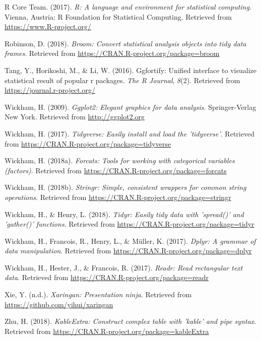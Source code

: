 \documentclass[man]{apa6}
\theoremstyle{definition}
\theoremstyle{definition}
\theoremstyle{definition}
\theoremstyle{remark}
\begin{document}
\hypertarget{ref-R-base}{}
R Core Team. (2017). \emph{R: A language and environment for statistical
computing}. Vienna, Austria: R Foundation for Statistical Computing.
Retrieved from \url{https://www.R-project.org/}

\hypertarget{ref-R-broom}{}
Robinson, D. (2018). \emph{Broom: Convert statistical analysis objects
into tidy data frames}. Retrieved from
\url{https://CRAN.R-project.org/package=broom}

\hypertarget{ref-R-ggfortify}{}
Tang, Y., Horikoshi, M., \& Li, W. (2016). Ggfortify: Unified interface
to visualize statistical result of popular r packages. \emph{The R
Journal}, \emph{8}(2). Retrieved from
\url{https://journal.r-project.org/}

\hypertarget{ref-R-ggplot2}{}
Wickham, H. (2009). \emph{Ggplot2: Elegant graphics for data analysis}.
Springer-Verlag New York. Retrieved from \url{http://ggplot2.org}

\hypertarget{ref-R-tidyverse}{}
Wickham, H. (2017). \emph{Tidyverse: Easily install and load the
'tidyverse'}. Retrieved from
\url{https://CRAN.R-project.org/package=tidyverse}

\hypertarget{ref-R-forcats}{}
Wickham, H. (2018a). \emph{Forcats: Tools for working with categorical
variables (factors)}. Retrieved from
\url{https://CRAN.R-project.org/package=forcats}

\hypertarget{ref-R-stringr}{}
Wickham, H. (2018b). \emph{Stringr: Simple, consistent wrappers for
common string operations}. Retrieved from
\url{https://CRAN.R-project.org/package=stringr}

\hypertarget{ref-R-tidyr}{}
Wickham, H., \& Henry, L. (2018). \emph{Tidyr: Easily tidy data with
'spread()' and 'gather()' functions}. Retrieved from
\url{https://CRAN.R-project.org/package=tidyr}

\hypertarget{ref-R-dplyr}{}
Wickham, H., Francois, R., Henry, L., \& Müller, K. (2017). \emph{Dplyr:
A grammar of data manipulation}. Retrieved from
\url{https://CRAN.R-project.org/package=dplyr}

\hypertarget{ref-R-readr}{}
Wickham, H., Hester, J., \& Francois, R. (2017). \emph{Readr: Read
rectangular text data}. Retrieved from
\url{https://CRAN.R-project.org/package=readr}

\hypertarget{ref-R-xaringan}{}
Xie, Y. (n.d.). \emph{Xaringan: Presentation ninja}. Retrieved from
\url{https://github.com/yihui/xaringan}

\hypertarget{ref-R-kableExtra}{}
Zhu, H. (2018). \emph{KableExtra: Construct complex table with 'kable'
and pipe syntax}. Retrieved from
\url{https://CRAN.R-project.org/package=kableExtra}
\end{document}
